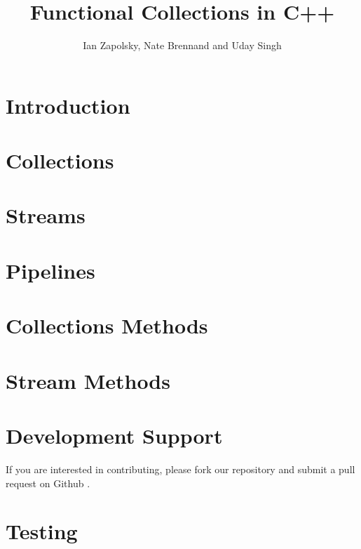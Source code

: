 \documentclass[11pt]{article}
\author{Ian Zapolsky, Nate Brennand and Uday Singh}
\title{Functional Collections in C++}
\begin{document}
\setlength{\parskip}{.1 in}

\maketitle
\newpage

\section{Introduction}


\section{Collections}


\section{Streams}


\section{Pipelines}


\section{Collections Methods}


\section{Stream Methods}


\section{Development Support}
If you are interested in contributing, please fork our repository and submit a pull request on Github \cite{github}.

\section{Testing}






\end{document}
